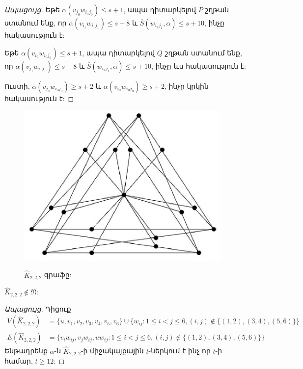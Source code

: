 \begin{hide}
\begin{proof}[Ապացույց]
Եթե $\alpha(v_{j_{0}}w_{i_{0}j_{0}})\leq s+1$, ապա դիտարկելով $P$ շղթան ստանում ենք, որ $\alpha(v_{i_{1}}w_{i_{1}j_{1}})\leq s+8$ և
$\overline{S}(w_{i_{1}j_{1}},\alpha)\leq s+10$, ինչը հակասություն է:

Եթե $\alpha(v_{i_{0}}w_{i_{0}j_{0}})\leq s+1$, ապա դիտարկելով $Q$ շղթան ստանում ենք, որ $\alpha(v_{j_{1}}w_{i_{1}j_{1}})\leq s+8$ և
$\overline{S}(w_{i_{1}j_{1}},\alpha)\leq s+10$, ինչը ևս հակասություն է:

Ուստի, $\alpha(v_{j_{0}}w_{i_{0}j_{0}})\geq s+2$ և
$\alpha(v_{i_{0}}w_{i_{0}j_{0}})\geq s+2$, ինչը կրկին հակասություն է:
\end{proof}


\begin{figure}[h]
\begin{center}
\includegraphics[width=25pc]{figures/K222.eps}\\
\caption{$\widehat{K}_{2,2,2}$ գրաֆը:}\label{f3_K222}
\end{center}
\end{figure}

\begin{theorem}
\label{t3_subdivision_K222} $\widehat{K}_{2,2,2}\notin \mathfrak{N}$:
\end{theorem}
\begin{proof}[Ապացույց]
Դիցուք
\begin{align*}
V(\widehat{K}_{2,2,2}) &=\{u,v_{1},v_{2},v_{3},v_{4},v_{5},v_{6}\}\cup
\{w_{ij}:1\leq i<j\leq 6,(i,j)\notin \{(1,2),(3,4),(5,6)\}\}\\
E(\widehat{K}_{2,2,2}) &=\{v_{i}w_{ij},v_{j}w_{ij},uw_{ij}:1\leq
i<j\leq 6,(i,j)\notin \{(1,2),(3,4),(5,6)\}\}
\end{align*}
Ենթադրենք $\alpha$-ն $\widehat{K}_{2,2,2}$-ի միջակայքային $t$-ներկում է ինչ որ $t$-ի համար, $t\geq 12$:


\end{proof}
\end{hide}
